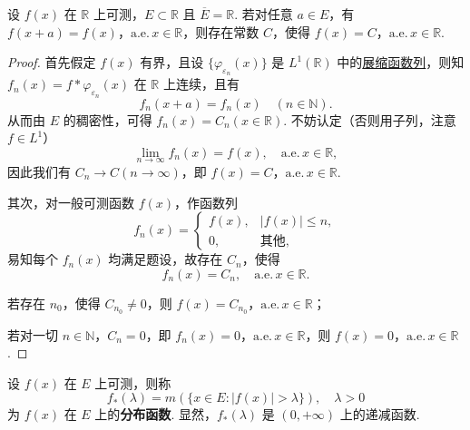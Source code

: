 \documentclass[../../main.tex]{subfiles}%
\begin{document}
\begin{example}
设 \( f(x) \) 在 \( \mathbb{R} \) 上可测，\( E \subset \mathbb{R} \) 且 \( \overline{E} = \mathbb{R} \). 若对任意 \( a \in E \)，有 \( f(x + a) = f(x) \)，\(\text{a.e.}\, x \in \mathbb{R} \)，则存在常数 \( C \)，使得 \( f(x) = C \)，\(\text{a.e.}\, x \in \mathbb{R} \).
\end{example}
\begin{proof}

首先假定 \( f(x) \) 有界，且设 \( \{ \varphi_{\varepsilon_n}(x) \} \) 是 \( L^1(\mathbb{R}) \) 中的\hyperref[definition:展缩函数]{展缩函数列}，则知 \( f_n(x) = f * \varphi_{\varepsilon_n}(x) \) 在 \( \mathbb{R} \) 上连续，且有
\[
f_n(x + a) = f_n(x) \quad (n \in \mathbb{N}).
\]
从而由 \( E \) 的稠密性，可得 \( f_n(x) = C_n (x \in \mathbb{R}) \). 不妨认定（否则用子列，注意 \( f \in L^1 \)）
\[
\lim_{n \to \infty} f_n(x) = f(x), \quad \text{a.e.}\, x \in \mathbb{R},
\]
因此我们有 \( C_n \to C (n \to \infty) \)，即 \( f(x) = C \)，\(\text{a.e.}\, x \in \mathbb{R} \).

其次，对一般可测函数 \( f(x) \)，作函数列
\[
f_n(x) = 
\begin{cases} 
f(x), & |f(x)| \leqslant  n, \\
0, & \text{其他},
\end{cases}
\]
易知每个 \( f_n(x) \) 均满足题设，故存在 \( C_n \)，使得
\[
f_n(x) = C_n, \quad \text{a.e.}\, x \in \mathbb{R}.
\]

若存在 \( n_0 \)，使得 \( C_{n_0} \neq 0 \)，则 \( f(x) = C_{n_0} \)，\(\text{a.e.}\, x \in \mathbb{R} \)；

若对一切 \( n \in \mathbb{N} \)，\( C_n = 0 \)，即 \( f_n(x) = 0 \)，\(\text{a.e.}\, x \in \mathbb{R} \)，则 \( f(x) = 0 \)，\(\text{a.e.}\, x \in \mathbb{R} \).

\end{proof}

\begin{definition}[分布函数]
设 \( f(x) \) 在 \( E \) 上可测，则称
\[
f_*(\lambda) = m(\{ x \in E : |f(x)| > \lambda \}), \quad \lambda > 0
\]
为 \( f(x) \) 在 \( E \) 上的\textbf{分布函数}. 显然，\( f_*(\lambda) \) 是 \( (0, +\infty) \) 上的递减函数.
\end{definition}
\end{document}
